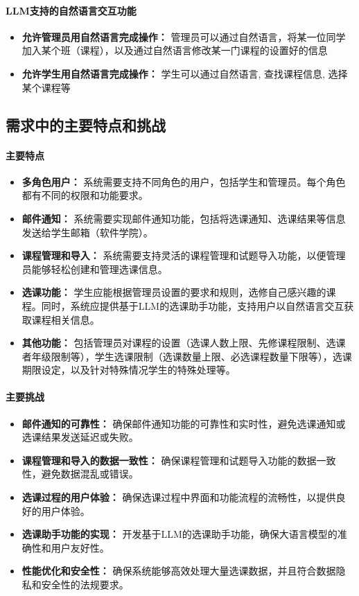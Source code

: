 \documentclass{article}
\begin{document}
\paragraph{LLM支持的自然语言交互功能}
\begin{itemize}
	\item \textbf{允许管理员用自然语言完成操作：} 管理员可以通过自然语言，将某一位同学加入某个班（课程），以及通过自然语言修改某一门课程的设置好的信息
	\item \textbf{允许学生用自然语言完成操作：} 学生可以通过自然语言, 查找课程信息, 选择某个课程等
\end{itemize}


\subsection{需求中的主要特点和挑战}
\paragraph{主要特点}
\begin{itemize}
	\item \textbf{多角色用户：} 系统需要支持不同角色的用户，包括学生和管理员。每个角色都有不同的权限和功能要求。
	\item \textbf{邮件通知：} 系统需要实现邮件通知功能，包括将选课通知、选课结果等信息发送给学生邮箱（软件学院）。
	\item \textbf{课程管理和导入：} 系统需要支持灵活的课程管理和试题导入功能，以便管理员能够轻松创建和管理选课信息。
	\item \textbf{选课功能：} 学生应能根据管理员设置的要求和规则，选修自己感兴趣的课程。同时，系统应提供基于LLM的选课助手功能，支持用户以自然语言交互获取课程相关信息。
	\item \textbf{其他功能：} 包括管理员对课程的设置（选课人数上限、先修课程限制、选课者年级限制等），学生选课限制（选课数量上限、必选课程数量下限等），选课期限设定，以及针对特殊情况学生的特殊处理等。
\end{itemize}

\paragraph{主要挑战}
\begin{itemize}
	\item \textbf{邮件通知的可靠性：}  确保邮件通知功能的可靠性和实时性，避免选课通知或选课结果发送延迟或失败。
	\item \textbf{课程管理和导入的数据一致性：} 确保课程管理和试题导入功能的数据一致性，避免数据混乱或错误。
	\item \textbf{选课过程的用户体验：} 确保选课过程中界面和功能流程的流畅性，以提供良好的用户体验。
	\item \textbf{选课助手功能的实现：} 开发基于LLM的选课助手功能，确保大语言模型的准确性和用户友好性。
	\item \textbf{性能优化和安全性：} 确保系统能够高效处理大量选课数据，并且符合数据隐私和安全性的法规要求。
\end{itemize}
\end{document}
